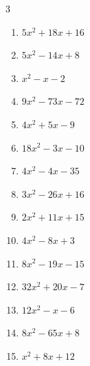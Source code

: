 \begin{multicols}{3}
\begin{enumerate}
  \item $5x^{2}+18x+16$

        \phantom{$=(5x+8)(x+2)$}

  \item $5x^{2}-14x+8$

        \phantom{$=(x-2)(5x-4)$}

  \item $x^{2}-x-2$

        \phantom{$=(x-2)(x+1)$}

  \item $9x^{2}-73x-72$

        \phantom{$=(x-9)(9x+8)$}

  \item $4x^{2}+5x-9$

        \phantom{$=(4x+9)(x-1)$}

  \item $18x^{2}-3x-10$

        \phantom{$=(6x-5)(3x+2)$}

\columnbreak %

  \item $4x^{2}-4x-35$

        \phantom{$=(2x+5)(2x-7)$}

  \item $3x^{2}-26x+16$

        \phantom{$=(x-8)(3x-2)$}

  \item $2x^{2}+11x+15$

        \phantom{$=(2x+5)(x+3)$}

  \item $4x^{2}-8x+3$

        \phantom{$=(2x-3)(2x-1)$}

  \item $8x^{2}-19x-15$

        \phantom{$=(8x+5)(x-3)$}

  \item $32x^{2}+20x-7$

        \phantom{$=(4x-1)(8x+7)$}

  \item $12x^{2}-x-6$

        \phantom{$=(4x-3)(3x+2)$}

  \item $8x^{2}-65x+8$

        \phantom{$=(8x-1)(x-8)$}

  \item $x^{2}+8x+12$


\end{enumerate}
\end{multicols}
